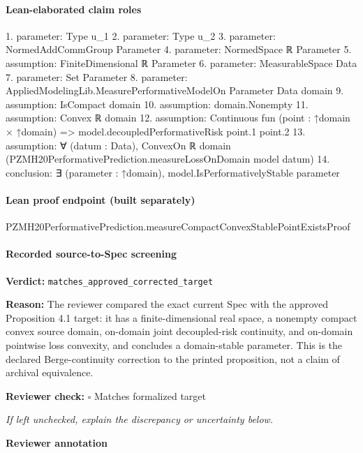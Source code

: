 \documentclass[10pt]{article}
\newcommand{\reviewerbox}{%
  \par\noindent\fbox{\parbox{0.96\linewidth}{\rule{0pt}{0.38in}}}\par
}
\newcommand{\reviewmatch}[1]{%
  \par\noindent\textbf{Reviewer check:} $\square$\; #1\par
  \noindent\emph{If left unchecked, explain the discrepancy or uncertainty below.}\par
}
\begin{document}
\paragraph{Lean-elaborated claim roles}\begin{ReviewVerbatim}
1. parameter: Type u_1
2. parameter: Type u_2
3. parameter: NormedAddCommGroup Parameter
4. parameter: NormedSpace ℝ Parameter
5. assumption: FiniteDimensional ℝ Parameter
6. parameter: MeasurableSpace Data
7. parameter: Set Parameter
8. parameter: AppliedModelingLib.MeasurePerformativeModelOn Parameter Data domain
9. assumption: IsCompact domain
10. assumption: domain.Nonempty
11. assumption: Convex ℝ domain
12. assumption: Continuous fun (point : ↑domain × ↑domain) => model.decoupledPerformativeRisk point.1 point.2
13. assumption: ∀ (datum : Data), ConvexOn ℝ domain (PZMH20PerformativePrediction.measureLossOnDomain model datum)
14. conclusion: ∃ (parameter : ↑domain), model.IsPerformativelyStable parameter
\end{ReviewVerbatim}

\paragraph{Lean proof endpoint (built separately)}\begin{ReviewVerbatim}
PZMH20PerformativePrediction.measureCompactConvexStablePointExistsProof
\end{ReviewVerbatim}

\paragraph{Recorded source-to-Spec screening}
\textbf{Verdict:} \texttt{matches\_approved\_corrected\_target}
\\
{\raggedright
\textbf{Reason:} The reviewer compared the exact current Spec with the approved Proposition 4.\allowbreak{}1 target:\allowbreak{} it has a finite-\allowbreak{}dimensional real space, a nonempty compact convex source domain, on-\allowbreak{}domain joint decoupled-\allowbreak{}risk continuity, and on-\allowbreak{}domain pointwise loss convexity, and concludes a domain-\allowbreak{}stable parameter.\allowbreak{} This is the declared Berge-\allowbreak{}continuity correction to the printed proposition, not a claim of archival equivalence.\allowbreak{}
\par}
\reviewmatch{Matches formalized target}
\noindent\textbf{Reviewer annotation}\par
\reviewerbox
\clearpage
\hypertarget{source-claim-a3115b33fe478ce6}{}
\end{document}
